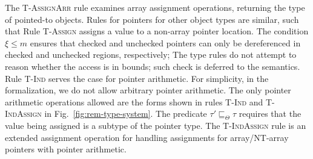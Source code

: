%
The \textsc{T-AssignArr} rule examines array assignment operations, returning the type of
pointed-to objects. Rules for pointers for other object types are
similar, such that Rule \textsc{T-Assign} assigns a value to a non-array pointer location.
The condition $\xi\le m$ ensures that checked and unchecked pointers 
can only be dereferenced in checked and unchecked regions, respectively;
The type rules do not attempt to reason whether the access is in bounds;
such check is deferred to the semantics.
Rule \textsc{T-Ind} serves the case for pointer arithmetic. For simplicity, in the \checkedc formalization, we do not allow arbitrary pointer arithmetic. The only pointer arithmetic operations allowed are the forms shown in rules \textsc{T-Ind} and \textsc{T-IndAssign} in Fig.~\ref{fig:rem-type-system}.  The predicate $\tau'\sqsubseteq_{\Theta} \tau$ requires that the value being assigned is a subtype of the pointer type.
The \textsc{T-IndAssign} rule is an extended assignment operation for handling assignments for array/NT-array pointers with pointer arithmetic.


